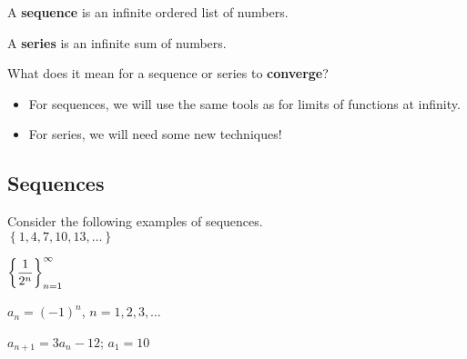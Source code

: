 \documentclass[12pt]{article}
\begin{document}
A \textbf{sequence} is an infinite ordered list of numbers.

\vfill

A \textbf{series} is an infinite sum of numbers.

\vfill

What does it mean for a sequence or series to \textbf{converge}?
\begin{itemize}
	\item For sequences, we will use the same tools as for limits of functions at infinity.
	\item For series, we will need some new techniques!
\end{itemize}

\newpage

\subsection*{Sequences}


\Examples Consider the following examples of sequences.\\

\hspace{5mm} $\left\{1, 4, 7, 10, 13, \dots\right\}$

\vfill

\hspace{5mm} $\displaystyle\left\{\frac{1}{2^n}\right\}_{n=1}^\infty$

\vfill

\hspace{5mm} $a_n=(-1)^n$, $n=1,2,3,\dots$

\vfill

\hspace{5mm} $a_{n+1}=3a_n-12$; $a_1=10$
\end{document}
